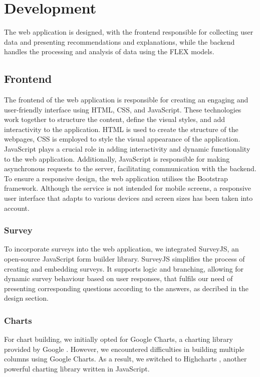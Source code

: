 \chapter{Development} 

The web application is designed, 
with the frontend responsible for collecting user data and presenting recommendations and explanations, 
while the backend handles the processing and analysis of data using the FLEX models. 


\section{Frontend}

The frontend of the web application is responsible for creating an engaging and user-friendly interface using HTML, CSS, and JavaScript. These technologies work together to structure the content, define the visual styles, and add interactivity to the application.
HTML is used to create the structure of the webpages, CSS is employed to style the visual appearance of the application. 
JavaScript plays a crucial role in adding interactivity and dynamic functionality to the web application. 
Additionally, JavaScript is responsible for making asynchronous requests to the server, facilitating communication with the backend.
To ensure a responsive design, the web application utilises the Bootstrap framework. 
Although the service is not intended for mobile screens, a responsive user interface that adapts to various devices and screen sizes has been taken into account. 


\subsection{Survey}

To incorporate surveys into the web application, we integrated SurveyJS, an open-source JavaScript form builder library. 
SurveyJS simplifies the process of creating and embedding surveys.
It supports logic and branching, allowing for dynamic survey behaviour based on user responses, 
that fulfils our need of presenting corresponding questions according to the answers, as decribed in the design section. 


\subsection{Charts}

For chart building, we initially opted for Google Charts, a charting library provided by Google \cite{googlecharts}. 
However, we encountered difficulties in building multiple columns using Google Charts. 
As a result, we switched to Highcharts \cite{highcharts}, another powerful charting library written in JavaScript. 


